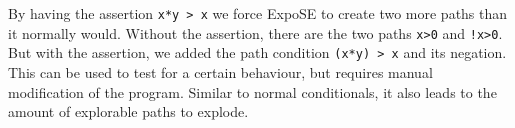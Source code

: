 By having the assertion \lstinline{x*y > x} we force ExpoSE to create two more paths than it normally would. Without the assertion, there are the two paths \lstinline{x>0} and \lstinline{!x>0}. But with the assertion, we added the path condition \lstinline{(x*y) > x} and its negation. This can be used to test for a certain behaviour, but requires manual modification of the program. Similar to normal conditionals, it also leads to the amount of explorable paths to explode.
